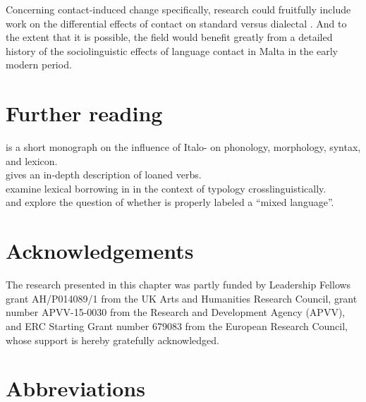 \documentclass[output=paper]{langsci/langscibook}
\begin{document}
Concerning contact-induced change specifically,  research could fruitfully include  work on the differential effects of contact on standard versus dialectal . And to the extent that it is possible, the field would benefit greatly from a detailed history of the sociolinguistic effects of language contact in Malta in the early modern period.

\section*{Further reading}
\cite{krier1976} is a short monograph on the influence of Italo- on  phonology, morphology, syntax, and lexicon. \\
\cite{mifsudloanverbs} gives an in-depth description of  loaned verbs. \\
\cite{comriespagnol2016} examine lexical borrowing in  in the context of  typology crosslinguistically. \\
\cite{Drewes1994} and \cite{stolz2003} explore the question of whether  is properly labeled a ``mixed language''.

\section*{Acknowledgements}
The research presented in this chapter was partly funded by Leadership Fellows grant AH/P014089/1 from the UK Arts and Humanities Research Council, grant number APVV-15-0030 from the  Research and Development Agency (APVV), and ERC Starting Grant number 679083 from the European Research Council, whose support is hereby gratefully acknowledged.

\section*{Abbreviations}
\end{document}
